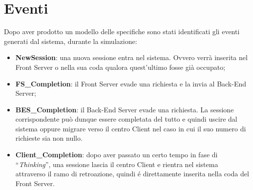 \section{Eventi}
Dopo aver prodotto un modello delle specifiche sono stati identificati gli 
eventi generati dal sistema, durante la simulazione:
\begin{itemize}
\item \textbf{NewSession}: una nuova sessione entra nel sistema. Ovvero verr\`a inserita 
nel Front Server o nella sua coda qualora quest'ultimo fosse gi\`a occupato;
\item \textbf{FS\_Completion}: il Front Server evade una richiesta e la invia al Back-End 
Server;
\item \textbf{BES\_Completion}: il Back-End Server evade una richiesta. La sessione 
corrispondente pu\`o dunque essere completata del tutto e quindi uscire dal 
sistema oppure migrare verso il centro Client nel caso in cui il suo numero di 
richieste sia non nullo.
\item \textbf{Client\_Completion}: dopo aver passato un certo tempo in fase di 
“\textit{Thinking}”, una sessione lascia il centro Client e rientra nel sistema 
attraverso il ramo di retroazione, quindi \'e direttamente inserita nella coda 
del Front Server.
\end{itemize}
